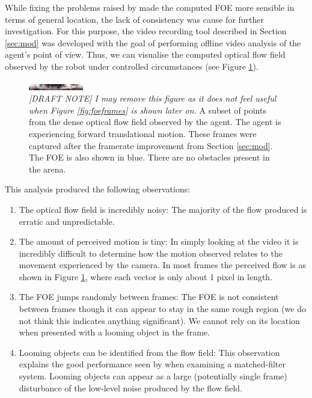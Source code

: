 \documentclass[a4paper,11pt,twoside,openright]{article}
\begin{document}
While fixing the problems raised by \cite{Mitchell2018} made the computed FOE
more sensible in terms of general location, the lack of consistency was cause
for further investigation. For this purpose, the video recording tool described
in Section \ref{sec:mod} was developed with the goal of performing offline
video analysis of the agent's point of view. Thus, we can visualise the
computed optical flow field observed by the robot under controlled circumstances
(see Figure \ref{fig:flowfield}).\newline\par

\begin{figure}[h!]
  \centering
  \includegraphics[width=\textwidth]{frame_00066}
  \caption{\label{fig:flowfield}
    \textit{[DRAFT NOTE] I may remove this figure as it does not feel
    useful when Figure \ref{fig:foeframes} is shown later on.}
    A subset of points from the dense optical flow field observed by the agent.
    The agent is experiencing forward translational motion. These frames were
    captured after the framerate improvement from Section \ref{sec:mod}. The
    FOE is also shown in blue. There are no obstacles present in the arena.
  }
\end{figure}

This analysis produced the following observations:
\begin{enumerate}
\item{
  The optical flow field is incredibly noisy: The majority of the flow produced
  is erratic and unpredictable.
}

\item{
  The amount of perceived motion is tiny: In simply looking at the video it is
  incredibly difficult to determine how the motion observed relates to the
  movement experienced by the camera. In most frames the perceived
  flow is as shown in Figure \ref{fig:flowfield}, where each vector is
  only about 1 pixel in length.
}

\item{ The FOE jumps randomly between frames: The FOE is not
  consistent between frames though it can appear to stay in the same
  rough region (we do not think this indicates anything
  significant). We cannot rely on its location when presented with a
  looming object in the frame.  }

\item{ Looming objects can be identified from the flow field: This
  observation explains the good performance seen by
  \cite{Mitchell2018} when examining a matched-filter system. Looming
  objects can appear as a large (potentially single frame) disturbance
  of the low-level noise produced by the flow field.  }
\end{enumerate}
\end{document}
